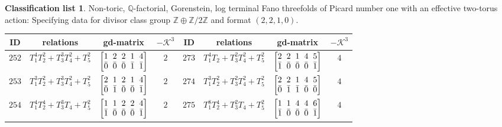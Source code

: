\documentclass[pdftex]{sigma}%
\theoremstyle{definition}
\newtheorem{class-list}[thm]{Classification list}
\def\ZZ{{\mathbb Z}}
\def\QQ{{\mathbb Q}}
\numberwithin{equation}{section}
\begin{document}
\begin{class-list}\label{class-list(0,2)}
Non-toric, $\QQ$-factorial, Gorenstein, log terminal Fano
threefolds of Picard number one with an effective two-torus action:
Specifying data for divisor class group $\ZZ \oplus \ZZ/2\ZZ$ and
format $(2,2,1,0)$.
\begin{table}[h!]\centering\setlength{\tabcolsep}{3.5pt}
\renewcommand{\arraystretch}{1.3}\small\tabulinesep=1mm
\begin{tabu}{c|c|c|c||c|c|c|c}
\hline
ID&relations&gd-matrix&$-\mathcal{K}^3$&ID&relations&gd-matrix&$-\mathcal{K}^3$
\\
\hline
${252}$&${T_{1}^{4}T_{2}^{2}+T_{3}^{3}T_{4}^{2}+T_{5}^{2}}$
&$\arraycolsep=1mm\begin{bmatrix}{1} & {2} & {2} & {1} & {4} \\ {\bar{0}} & {\bar{0}} & {\bar{0}} & {\bar{1}} & {\bar{1}}\end{bmatrix}$&${2}$
&${273}$&${T_{1}^{4}T_{2}+T_{3}^{2}T_{4}^{2}+T_{5}^{2}}$
&$\arraycolsep=1mm\begin{bmatrix}{2} & {2} & {1} & {4} & {5} \\ {\bar{1}} & {\bar{0}} & {\bar{0}} & {\bar{0}} & {\bar{1}}\end{bmatrix}$&${4}$
\\
\hline
${253}$&${T_{1}^{3}T_{2}^{2}+T_{3}^{3}T_{4}^{2}+T_{5}^{2}}$
&$\arraycolsep=1mm\begin{bmatrix}{2} & {1} & {2} & {1} & {4} \\ {\bar{0}} & {\bar{1}} & {\bar{0}} & {\bar{0}} & {\bar{1}}\end{bmatrix}$&${2}$
&${274}$&${T_{1}^{3}T_{2}^{2}+T_{3}^{2}T_{4}^{2}+T_{5}^{2}}$
&$\arraycolsep=1mm\begin{bmatrix}{2} & {2} & {1} & {4} & {5} \\ {\bar{0}} & {\bar{1}} & {\bar{1}} & {\bar{0}} & {\bar{0}}\end{bmatrix}$&${4}$
\\
\hline
${254}$&${T_{1}^{4}T_{2}^{4}+T_{3}^{3}T_{4}+T_{5}^{2}}$
&$\arraycolsep=1mm\begin{bmatrix}{1} & {1} & {2} & {2} & {4} \\ {\bar{1}} & {\bar{0}} & {\bar{0}} & {\bar{0}} & {\bar{1}}\end{bmatrix}$&${2}$
&${275}$&${T_{1}^{8}T_{2}^{4}+T_{3}^{2}T_{4}+T_{5}^{2}}$
&$\arraycolsep=1mm\begin{bmatrix}{1} & {1} & {4} & {4} & {6} \\ {\bar{1}} & {\bar{0}} & {\bar{0}} & {\bar{0}} & {\bar{1}}\end{bmatrix}$&${4}$

\end{tabu}
\end{table}
\end{class-list}
\end{document}
